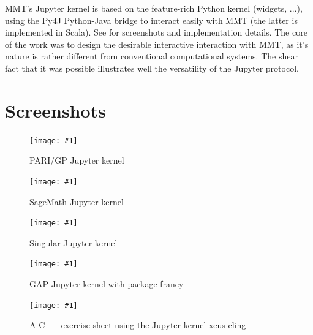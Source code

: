\documentclass{deliverablereport}
\begin{document}
MMT's Jupyter kernel is based on the feature-rich Python kernel
(widgets, ...), using the Py4J Python-Java bridge to interact easily
with MMT (the latter is implemented in Scala). See
 for screenshots and implementation
details. The core of the work was to design the desirable interactive
interaction with MMT, as it's nature is rather different from
conventional computational systems. The shear fact that it was
possible illustrates well the versatility of the Jupyter protocol.


\appendix
\section{Screenshots}
\newcommand{\screenshot}[2]{
\begin{figure}[ht]
  \texttt{[image: \#1]}
  \caption{#2}
\end{figure}}

\screenshot{pari.png}{PARI/GP Jupyter kernel}
\screenshot{sage.png}{SageMath Jupyter kernel}
\screenshot{singular_new.png}{Singular Jupyter kernel}
\clearpage
\screenshot{gap.png}{GAP Jupyter kernel with package francy}
\clearpage
\screenshot{cling-teaching.png}{A C++ exercise sheet using the Jupyter kernel xeus-cling}
\end{document}

